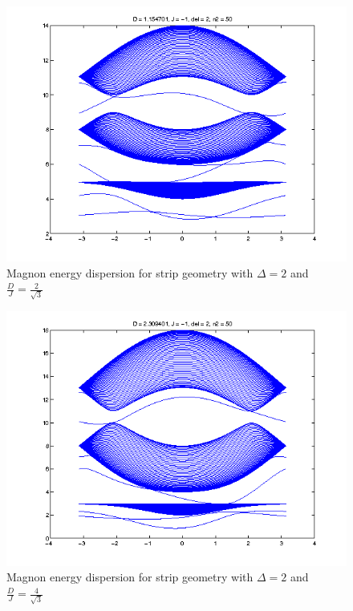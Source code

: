 \begin{figure}
    \centering
    \includegraphics[scale = 0.5]{latex_plots/phase_1_2_sqrt(3).png}
    \caption{Magnon energy dispersion for strip geometry with $\Delta =2$ and $\frac{D}{J} = \frac{2}{\sqrt{3}}$}
\end{figure}
\begin{figure}
    \centering
    \includegraphics[scale = 0.5]{latex_plots/phase_1_4_sqrt(3).png}
    \caption{Magnon energy dispersion for strip geometry with $\Delta =2$ and $\frac{D}{J} = \frac{4}{\sqrt{3}}$}
\end{figure}
\clearpage


